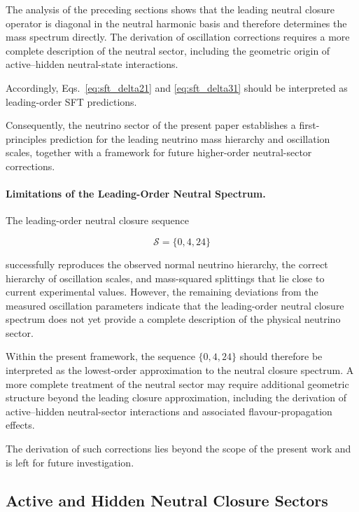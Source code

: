 \documentclass[11pt]{article}
\theoremstyle{definition}
\theoremstyle{remark}
\begin{document}
The analysis of the preceding sections shows that the leading neutral closure operator is diagonal in the neutral harmonic basis and therefore determines the mass spectrum directly. The derivation of oscillation corrections requires a more complete description of the neutral sector, including the geometric origin of active--hidden neutral-state interactions.

Accordingly, Eqs.~\eqref{eq:sft_delta21} and
\eqref{eq:sft_delta31} should be interpreted as leading-order SFT predictions.

Consequently, the neutrino sector of the present paper establishes a first-principles prediction for the leading neutrino mass hierarchy and oscillation scales, together with a framework for future higher-order neutral-sector corrections.

\paragraph{Limitations of the Leading-Order Neutral Spectrum.}

The leading-order neutral closure sequence

\[
\mathcal S
=
\{0,4,24\}
\]

successfully reproduces the observed normal neutrino hierarchy,
the correct hierarchy of oscillation scales, and mass-squared
splittings that lie close to current experimental values.
However, the remaining deviations from the measured oscillation
parameters indicate that the leading-order neutral closure
spectrum does not yet provide a complete description of the
physical neutrino sector.

Within the present framework, the sequence
\(\{0,4,24\}\) should therefore be interpreted as the
lowest-order approximation to the neutral closure spectrum.
A more complete treatment of the neutral sector may require
additional geometric structure beyond the leading closure
approximation, including the derivation of active--hidden
neutral-sector interactions and associated flavour-propagation
effects.

The derivation of such corrections lies beyond the scope of the
present work and is left for future investigation.



\subsection{Active and Hidden Neutral Closure Sectors}
\label{subsec:active_hidden_neutral_sectors}
\end{document}
